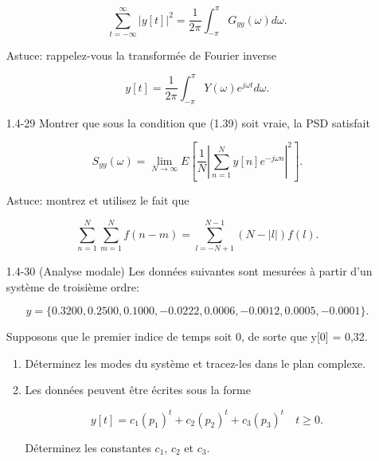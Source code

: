 \documentclass[10pt,twoside,a4paper]{book}
\begin{document}
\begin{enumerate}
  \begin{equation*}
    \sum_{t=-\infty}^{\infty} |y[t]|^2 = \frac{1}{2\pi} \int_{-\pi}^{\pi} G_{yy}(\omega)d\omega.
  \end{equation*}

  \noindent
  Astuce: rappelez-vous la transformée de Fourier inverse

  \begin{equation*}
    y[t] = \frac{1}{2\pi} \int_{-\pi}^{\pi} Y(\omega) e^{j\omega t} d\omega.
  \end{equation*}

  \item[1.4-29] Montrer que sous la condition que (1.39) soit vraie, la PSD satisfait
  
  \begin{equation*}
    S_{yy}(\omega) = \lim_{N \longrightarrow \infty} E \left[\frac{1}{N} \left| \sum_{n=1}^{N} y[n]e^{-j\omega n} \right|^2 \right].
  \end{equation*}

  \noindent
  Astuce: montrez et utilisez le fait que

  \begin{equation*}
    \sum_{n=1}^{N} \sum_{m=1}^{N} f(n-m) = \sum_{l=-N+1}^{N-1} (N-|l|) f(l).
  \end{equation*}

  \item[1.4-30] (Analyse modale) Les données suivantes sont mesurées à partir d'un système de troisième ordre:
  
  \begin{equation*}
    y = \{0.3200, 0.2500, 0.1000, -0.0222, 0.0006, -0.0012, 0.0005, -0.0001 \}.
  \end{equation*}

  \noindent
  Supposons que le premier indice de temps soit 0, de sorte que y[0] = 0,32.

  \begin{enumerate}
    \item Déterminez les modes du système et tracez-les dans le plan complexe.
    \item Les données peuvent être écrites sous la forme
    
    \begin{equation*}
      y[t] = c_1(p_1)^t + c_2(p_2)^t + c_3(p_3)^t \quad t \geq 0.
    \end{equation*}

    \noindent
    Déterminez les constantes $c_1$, $c_2$ et $c_3$.


\end{enumerate}
\end{enumerate}
\end{document}
